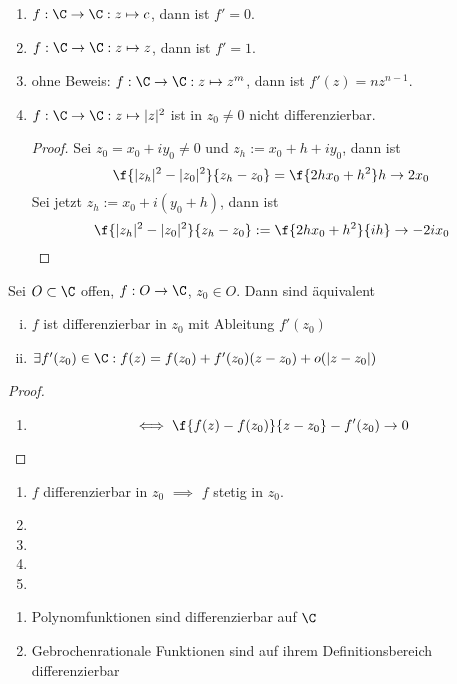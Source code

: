 \documentclass[a4paper,10pt]{scrartcl}
\begin{document}
\begin{ex*}
	\begin{enumerate}[1)]
		\item 
			$f: \C \to \C : z\mapsto c$, dann ist $f'=0$.
		\item
			$f: \C \to \C : z\mapsto z$, dann ist $f'=1$.
		\item
			ohne Beweis: $f:\C \to \C :z\mapsto z^m$, dann ist $f'(z) = nz^{n-1}$.
		\item
			$f: \C\to \C : z\mapsto |z|^2$ ist in $z_0\neq 0$ nicht differenzierbar.
			\begin{proof}
				Sei $z_0 = x_0+iy_0 \neq 0$ und $z_h:= x_0+h +iy_0$, dann ist
				\[
					\f {|z_h|^2 -|z_0|^2}{z_h-z_0} = \f {2hx_0+h^2}h \to 2x_0
				\]
				Sei jetzt $z_h := x_0 + i(y_0+h)$, dann ist
				\[
					\f {|z_h|^2 -|z_0|^2}{z_h-z_0} := \f {2hx_0+h^2}{ih} \to -2ix_0
				\]
			\end{proof}
	\end{enumerate}
\end{ex*}

\begin{st}
	\label{st:1.24}
	Sei $O\subset \C$ offen, $f:O\to \C$, $z_0\in O$.
	Dann sind äquivalent
	\begin{enumerate}[(i)]
		\item
			$f$ ist differenzierbar in $z_0$ mit Ableitung $f'(z_0)$
		\item
			$\exists f'(z_0) \in \C : f(z) =f(z_0)+f'(z_0)(z-z_0)+o(|z-z_0|)$
	\end{enumerate}
	\begin{proof}
		\begin{enumerate}
			\item 
				\[
					\iff \f{f(z)-f(z_0)}{z-z_0}-f'(z_0) \to 0
				\]
				\fixme
		\end{enumerate}
	\end{proof}
\end{st}

\begin{st}
	\label{1.25}
	\begin{enumerate}[1)]
		\item 
			$f$ differenzierbar in $z_0$ $\implies$ $f$ stetig in $z_0$.
		\item
		\item
		\item
		\item
	\end{enumerate}
\end{st}

\begin{ex}
	\begin{enumerate}[1)]
		\item 
			Polynomfunktionen sind differenzierbar auf $\C$
		\item
			Gebrochenrationale Funktionen sind auf ihrem Definitionsbereich differenzierbar
	\end{enumerate}
\end{ex}
\end{document}
